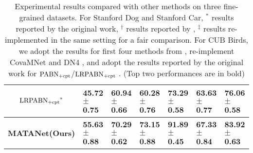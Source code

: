 \documentclass[final]{cvpr}
\begin{document}
\begin{table*}
\begin{tabular}{c  p{1.8cm}<{\centering}  p{1.8cm}<{\centering}  p{1.8cm}<{\centering}  p{1.8cm}<{\centering}  p{1.8 cm}<{\centering}  p{1.8cm}<{\centering} }
			$\rm {LRPABN_{+cpt}}^*$ \cite{huang2020low} & 45.72$\pm$\footnotesize{0.75} & 60.94$\pm$\footnotesize{0.66} & \textbf{60.28}$\pm$\textbf{\footnotesize{0.76}} & 73.29$\pm$\footnotesize{0.58} & \textbf{63.63}$\pm$\textbf{\footnotesize{0.77}} & 76.06$\pm$\footnotesize{0.58} \\		
			\midrule 
			\textbf{MATANet(Ours)} & \textbf{55.63}$\pm$\textbf{\footnotesize{0.88}} & \textbf{70.29}$\pm$\textbf{\footnotesize{0.62}}   & \textbf{73.15}$\pm$\textbf{\footnotesize{0.88}}  & \textbf{91.89}$\pm$\textbf{\footnotesize{0.45}} &  \textbf{67.33}$\pm$\textbf{\footnotesize{0.84}}  & \textbf{83.92} $\pm$\textbf{\footnotesize{0.63}} \\
			\bottomrule
		\end{tabular}
		\caption{Experimental results compared with other methods on three fine-grained datasets. For Stanford Dog and Stanford Car, $^*$ results reported by the original work, $^\dagger$ results reported by \cite{li2019revisiting}, $^\ddagger$ results re-implemented in the same setting for a fair comparison. For CUB Birds, we adopt the results for first four methods from \cite{chen2019closer}, re-implement CovaMNet \cite{li2019distribution} and DN4 \cite{li2019revisiting}, and adopt the results reported by the original work for $\rm {PABN_{+cpt}}$/$\rm {LRPABN_{+cpt}}$ \cite{huang2020low}. (Top two performances are in bold)}
	\end{table*}
	
\end{document}
